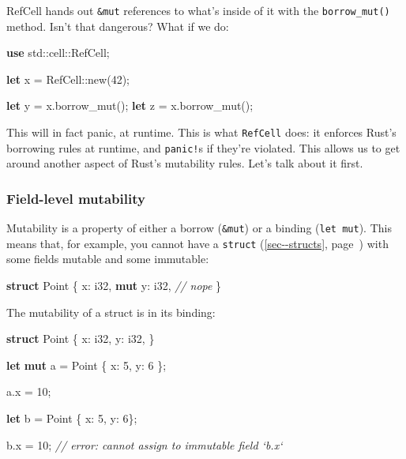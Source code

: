 \documentclass[a4paper,]{book}
\renewcommand*{\hyperref}[2][\ar]{%
  \def\ar{#2}%
  #2 (\autoref{#1}, page~\pageref{#1})}
\newenvironment{Shaded}{\begin{snugshade}}{\end{snugshade}}
\newcommand{\KeywordTok}[1]{\textcolor[rgb]{0.13,0.29,0.53}{\textbf{{#1}}}}
\newcommand{\DataTypeTok}[1]{\textcolor[rgb]{0.13,0.29,0.53}{{#1}}}
\newcommand{\DecValTok}[1]{\textcolor[rgb]{0.00,0.00,0.81}{{#1}}}
\newcommand{\CommentTok}[1]{\textcolor[rgb]{0.56,0.35,0.01}{\textit{{#1}}}}
\newcommand{\NormalTok}[1]{{#1}}
\begin{document}
RefCell hands out \texttt{\&mut} references to what's inside of it with
the \texttt{borrow\_mut()} method. Isn't that dangerous? What if we do:

\begin{Shaded}
\begin{Highlighting}[]
\KeywordTok{use} \NormalTok{std::cell::RefCell;}

\KeywordTok{let} \NormalTok{x = RefCell::new(}\DecValTok{42}\NormalTok{);}

\KeywordTok{let} \NormalTok{y = x.borrow_mut();}
\KeywordTok{let} \NormalTok{z = x.borrow_mut();}
\end{Highlighting}
\end{Shaded}

This will in fact panic, at runtime. This is what \texttt{RefCell} does:
it enforces Rust's borrowing rules at runtime, and \texttt{panic!}s if
they're violated. This allows us to get around another aspect of Rust's
mutability rules. Let's talk about it first.

\subsubsection{Field-level mutability}\label{field-level-mutability}

Mutability is a property of either a borrow (\texttt{\&mut}) or a
binding (\texttt{let\ mut}). This means that, for example, you cannot
have a \hyperref[sec--structs]{\texttt{struct}} with some fields mutable
and some immutable:

\begin{Shaded}
\begin{Highlighting}[]
\KeywordTok{struct} \NormalTok{Point \{}
    \NormalTok{x: }\DataTypeTok{i32}\NormalTok{,}
    \KeywordTok{mut} \NormalTok{y: }\DataTypeTok{i32}\NormalTok{, }\CommentTok{// nope}
\NormalTok{\}}
\end{Highlighting}
\end{Shaded}

The mutability of a struct is in its binding:

\begin{Shaded}
\begin{Highlighting}[]
\KeywordTok{struct} \NormalTok{Point \{}
    \NormalTok{x: }\DataTypeTok{i32}\NormalTok{,}
    \NormalTok{y: }\DataTypeTok{i32}\NormalTok{,}
\NormalTok{\}}

\KeywordTok{let} \KeywordTok{mut} \NormalTok{a = Point \{ x: }\DecValTok{5}\NormalTok{, y: }\DecValTok{6} \NormalTok{\};}

\NormalTok{a.x = }\DecValTok{10}\NormalTok{;}

\KeywordTok{let} \NormalTok{b = Point \{ x: }\DecValTok{5}\NormalTok{, y: }\DecValTok{6}\NormalTok{\};}

\NormalTok{b.x = }\DecValTok{10}\NormalTok{; }\CommentTok{// error: cannot assign to immutable field `b.x`}
\end{Highlighting}
\end{Shaded}
\end{document}
